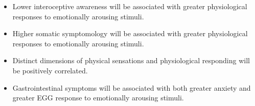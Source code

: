 \documentclass[]{book}
\providecommand{\tightlist}{%
  \setlength{\itemsep}{0pt}\setlength{\parskip}{0pt}}
\begin{document}
\begin{enumerate}
  \begin{itemize}
  \tightlist
  \item
    Lower interoceptive awareness will be associated with greater physiological responses to emotionally arousing stimuli.
  \item
    Higher somatic symptomology will be associated with greater physiological responses to emotionally arousing stimuli.
  \item
    Distinct dimensions of physical sensations and physiological responding will be positively correlated.
  \item
    Gastrointestinal symptoms will be associated with both greater anxiety and greater EGG response to emotionally arousing stimuli.
  \end{itemize}
\end{enumerate}


\end{document}
